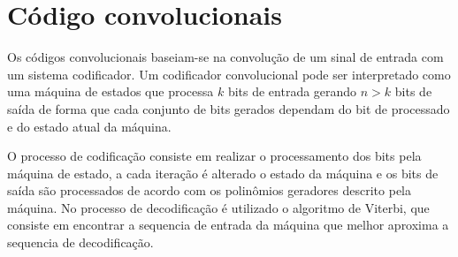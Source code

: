 \section{Código convolucionais}

Os códigos convolucionais baseiam-se na convolução de um sinal de entrada com um sistema codificador. Um codificador convolucional pode ser interpretado como uma máquina de estados que processa $k$ bits de entrada gerando $n>k$ bits de saída de forma que cada conjunto de bits gerados dependam do bit de processado e do estado atual da máquina.

O processo de codificação consiste em realizar o processamento dos bits pela máquina de estado, a cada iteração é alterado o estado da máquina e os bits de saída são processados de acordo com os polinômios geradores descrito pela máquina. No processo de decodificação é utilizado o algoritmo de Viterbi, que consiste em encontrar a sequencia de entrada da máquina que melhor aproxima a sequencia  de decodificação.